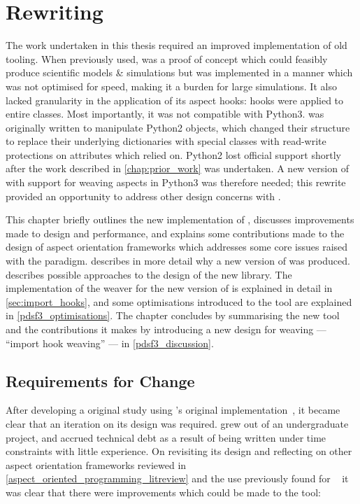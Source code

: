 \chapter{Rewriting \pdsf{}}
\label{chap:pdsf_rewrite}



The work undertaken in this thesis required an improved implementation of old
tooling. When previously used, \pdsf{} was a proof of concept which could
feasibly produce scientific models \& simulations but was implemented in a
manner which was not optimised for speed, making it a burden for large
simulations. It also lacked granularity in the application of its aspect hooks:
hooks were applied to entire classes. Most importantly, it was not compatible
with Python3. \pdsf{} was originally written to manipulate Python2 objects,
which changed their structure to replace their underlying dictionaries with
special classes with read-write protections on attributes which \pdsf{} relied
on. Python2 lost official support shortly after the work described in
\cref{chap:prior_work} was undertaken. A new version of \pdsf{} with support for
weaving aspects in Python3 was therefore needed; this rewrite provided an
opportunity to address other design concerns with \pdsf{}.

This chapter briefly outlines the new implementation of \pdsf{}, discusses
improvements made to design and performance, and explains some contributions
made to the design of aspect orientation frameworks which addresses some core
issues raised with the paradigm.  describes in more
detail why a new version of \pdsf{} was produced. 
describes possible approaches to the design of the new library. The
implementation of the weaver for the new version of \pdsf{} is explained in
detail in \cref{sec:import_hooks}, and some optimisations introduced to the tool
are explained in \cref{pdsf3_optimisations}. The chapter concludes by
summarising the new tool and the contributions it makes by introducing a new
design for weaving --- ``import hook weaving'' --- in \cref{pdsf3_discussion}.


\section{Requirements for Change}\label{sec:pdsf3requirements}

After developing a original study using \pdsf{}'s original implementation~\cite{wallis2018caise}, it
became clear that an iteration on its design was required. \pdsf{} grew out of
an undergraduate project, and accrued technical debt as a result of being
written under time constraints with little experience. On revisiting its design
and reflecting on other aspect orientation frameworks reviewed in  
\cref{aspect_oriented_programming_litreview} and the use previously found for
\pdsf{}~\cite{wallis2018caise,wallis2018genetic} it was clear that there were
improvements which could be made to the tool:

